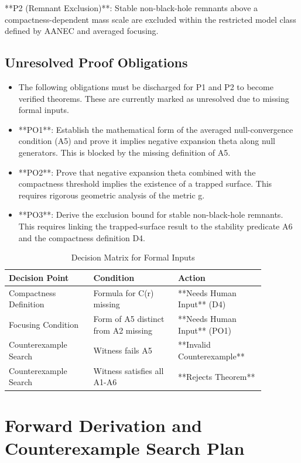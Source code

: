 \documentclass[conference]{IEEEtran}
\begin{document}
**P2 (Remnant Exclusion)**: Stable non-black-hole remnants above a compactness-dependent mass scale are excluded within the restricted model class defined by AANEC and averaged focusing.

\subsection{Unresolved Proof Obligations}
\begin{itemize}
\item The following obligations must be discharged for P1 and P2 to become verified theorems. These are currently marked as unresolved due to missing formal inputs.
\item **PO1**: Establish the mathematical form of the averaged null-convergence condition (A5) and prove it implies negative expansion theta along null generators. This is blocked by the missing definition of A5.
\item **PO2**: Prove that negative expansion theta combined with the compactness threshold implies the existence of a trapped surface. This requires rigorous geometric analysis of the metric g.
\item **PO3**: Derive the exclusion bound for stable non-black-hole remnants. This requires linking the trapped-surface result to the stability predicate A6 and the compactness definition D4.
\end{itemize}

\begin{table}[htbp]
\centering
\small


\caption{Decision Matrix for Formal Inputs}
\label{tab:definitions-and-propositions-def-table}
\begin{tabular}{|p{0.29\linewidth}|p{0.29\linewidth}|p{0.29\linewidth}|}
\hline
Decision Point & Condition & Action \\\hline
Compactness Definition & Formula for C(r) missing & **Needs Human Input** (D4) \\\hline
Focusing Condition & Form of A5 distinct from A2 missing & **Needs Human Input** (PO1) \\\hline
Counterexample Search & Witness fails A5 & **Invalid Counterexample** \\\hline
Counterexample Search & Witness satisfies all A1-A6 & **Rejects Theorem** \\\hline
\end{tabular}
\end{table}

\section{Forward Derivation and Counterexample Search Plan}
\end{document}
